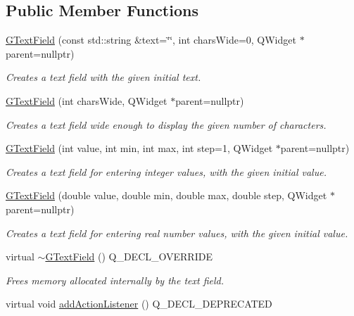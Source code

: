 \subsection*{Public Member Functions}
\begin{DoxyCompactItemize}
\item 
\mbox{\hyperlink{classGTextField_aab905bd4d32eef20c4b8ed701a8ec97f}{G\+Text\+Field}} (const std\+::string \&text=\char`\"{}\char`\"{}, int chars\+Wide=0, Q\+Widget $\ast$parent=nullptr)
\begin{DoxyCompactList}\small\item\em Creates a text field with the given initial text. \end{DoxyCompactList}\item 
\mbox{\hyperlink{classGTextField_a036419be062e4f447008a78dae22921c}{G\+Text\+Field}} (int chars\+Wide, Q\+Widget $\ast$parent=nullptr)
\begin{DoxyCompactList}\small\item\em Creates a text field wide enough to display the given number of characters. \end{DoxyCompactList}\item 
\mbox{\hyperlink{classGTextField_a4caf2f90e21e32abf032c99a8c3f8efb}{G\+Text\+Field}} (int value, int min, int max, int step=1, Q\+Widget $\ast$parent=nullptr)
\begin{DoxyCompactList}\small\item\em Creates a text field for entering integer values, with the given initial value. \end{DoxyCompactList}\item 
\mbox{\hyperlink{classGTextField_a8d164bf18d4dd4da6d5af0d23ee3a2c8}{G\+Text\+Field}} (double value, double min, double max, double step, Q\+Widget $\ast$parent=nullptr)
\begin{DoxyCompactList}\small\item\em Creates a text field for entering real number values, with the given initial value. \end{DoxyCompactList}\item 
virtual \mbox{\hyperlink{classGTextField_a5f71a42054388fb9dc24da9d8322ccdd}{$\sim$\+G\+Text\+Field}} () Q\+\_\+\+D\+E\+C\+L\+\_\+\+O\+V\+E\+R\+R\+I\+DE
\begin{DoxyCompactList}\small\item\em Frees memory allocated internally by the text field. \end{DoxyCompactList}\item 
virtual void \mbox{\hyperlink{classGInteractor_a02f20ea6edfa0671f31c4c648a253833}{add\+Action\+Listener}} () Q\+\_\+\+D\+E\+C\+L\+\_\+\+D\+E\+P\+R\+E\+C\+A\+T\+ED

\end{DoxyCompactItemize}
